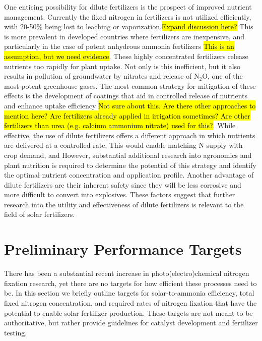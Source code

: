 One enticing possibility for dilute fertilizers is the prospect of improved nutrient management. Currently the fixed nitrogen in fertilizers is not utilized efficiently, with 20-50\% being lost to leaching or vaporization.\hl{Expand discussion here?} \needcite This is more prevalent in developed countries where fertilizers are inexpensive, and particularly in the case of potent anhydrous ammonia fertilizers \needcite \hl{This is an assumption, but we need evidence}. These highly concentrated fertilizers release nutrients too rapidly for plant uptake. Not only is this inefficient, but it also results in pollution of groundwater by nitrates and release of N$_2$O, one of the most potent greenhouse gases. The most common strategy for mitigation of these effects is the development of coatings that aid in controlled release of nutrients and enhance uptake efficiency \hl{Not sure about this. Are there other approaches to mention here? Are fertilizers already applied in irrigation sometimes? Are other fertilizers than urea (e.g. calcium ammonium nitrate) used for this?}. While effective, the use of dilute fertilizers offers a different approach in which nutrients are delivered at a controlled rate. This would enable matching N supply with crop demand, and However, substantial additional research into agronomics and plant nutrition is required to determine the potential of this strategy and identify the optimal nutrient concentration and application profile. Another advantage of dilute fertilizers are their inherent safety since they will be less corrosive and more difficult to convert into explosives. These factors suggest that further research into the utility and effectiveness of dilute fertilizers is relevant to the field of solar fertilizers.

\section{Preliminary Performance Targets}
\label{sec:targets}

There has been a substantial recent increase in photo(electro)chemical nitrogen fixation research, yet there are no targets for how efficient these processes need to be. In this section we briefly outline targets for solar-to-ammonia efficiency, total fixed nitrogen concentration, and required rates of nitrogen fixation that have the potential to enable solar fertilizer production. These targets are not meant to be authoritative, but rather provide guidelines for catalyst development and fertilizer testing. 

